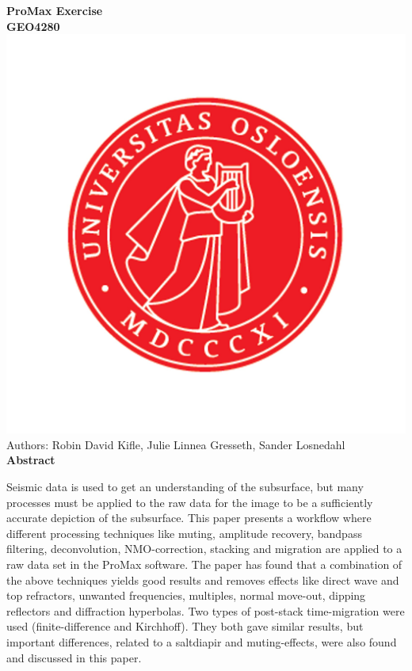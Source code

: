 \documentclass[10pt,a4paper]{article}
\begin{document}
\begin{center}
{\LARGE\bf ProMax Exercise\\GEO4280}
\\

\includegraphics[scale=0.1]{UiO.jpg}\\


Authors: Robin David Kifle, Julie Linnea Gresseth, Sander Losnedahl
\\
{\large\bf Abstract}
\end{center}

\noindent Seismic data is used to get an understanding of the subsurface, but many processes must be applied to the raw data for the image to be a sufficiently accurate depiction of the subsurface. This paper presents a workflow where different processing techniques like muting, amplitude recovery, bandpass filtering, deconvolution, NMO-correction, stacking and migration are applied to a raw data set in the ProMax software. The paper has found that a combination of the above techniques yields good results and removes effects like direct wave and top refractors, unwanted frequencies, multiples, normal move-out, dipping reflectors and diffraction hyperbolas. Two types of post-stack time-migration were used (finite-difference and Kirchhoff). They both gave similar results, but important differences, related to a saltdiapir and muting-effects, were also found and discussed in this paper.
\end{document}
